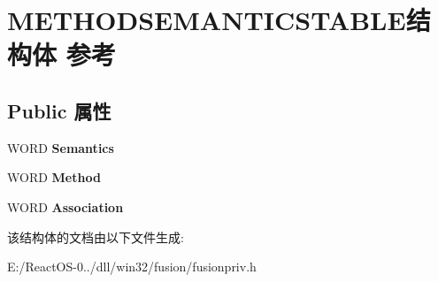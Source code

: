 \hypertarget{struct_m_e_t_h_o_d_s_e_m_a_n_t_i_c_s_t_a_b_l_e}{}\section{M\+E\+T\+H\+O\+D\+S\+E\+M\+A\+N\+T\+I\+C\+S\+T\+A\+B\+L\+E结构体 参考}
\label{struct_m_e_t_h_o_d_s_e_m_a_n_t_i_c_s_t_a_b_l_e}
\subsection*{Public 属性}
\begin{DoxyCompactItemize}
\item 
\mbox{\label{struct_m_e_t_h_o_d_s_e_m_a_n_t_i_c_s_t_a_b_l_e_a079c7de9ecd917e62b160d09fc9f3a5e}} 
W\+O\+RD {\bfseries Semantics}
\item 
\mbox{\label{struct_m_e_t_h_o_d_s_e_m_a_n_t_i_c_s_t_a_b_l_e_ac8d0a8e3a41dc993dca256e7f5739d9b}} 
W\+O\+RD {\bfseries Method}
\item 
\mbox{\label{struct_m_e_t_h_o_d_s_e_m_a_n_t_i_c_s_t_a_b_l_e_ad2fb20db0875cb843ff0ffad255b3404}} 
W\+O\+RD {\bfseries Association}
\end{DoxyCompactItemize}


该结构体的文档由以下文件生成\+:\begin{DoxyCompactItemize}
\item 
E\+:/\+React\+O\+S-\/0../dll/win32/fusion/fusionpriv.\+h\end{DoxyCompactItemize}
